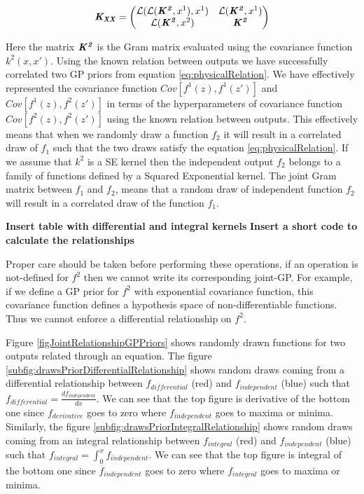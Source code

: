 \begin{equation}
    \bm{\mathit{K_{XX}}} = \begin{pmatrix}
    \mathcal{L}(\mathcal{L}(\bm{\mathit{K^2}}, x^{1}), x^{1}) & \mathcal{L}(\bm{\mathit{K^2}}, x^{1})\\ \mathcal{L}(\bm{\mathit{K^2}}, x^{2}) & \bm{\mathit{K^2}}
    \end{pmatrix} 
\end{equation}

Here the matrix $\bm{\mathit{K^2}}$ is the Gram matrix evaluated using the covariance function $k^2(x, x')$. Using the known relation between outputs we have successfully correlated two GP priors from equation \ref{eq:physicalRelation}. We have effectively represented the covariance function \(Cov[f^1(z), f^1(z')]\) and \(Cov[f^1(z), f^2(z')]\) in terms of the hyperparameters of covariance function $Cov[f^2(z), f^2(z')]$ using the known relation between outputs. This effectively means that when we randomly draw a function \(f_{2}\) it will result in a correlated draw of \(f_{1}\) such that the two draws satisfy the equation \ref{eq:physicalRelation}. If we assume that $k^2$ is a SE kernel then the independent output \(f_{2}\) belongs to a family of functions defined by a Squared Exponential kernel. The joint Gram matrix between \(f_{1}\) and \(f_{2}\), means that a random draw of independent function \(f_{2}\) will result in a correlated draw of the function \(f_{1}\). 

\textbf{Insert table with differential and integral kernels}
\textbf{Insert a short code to calculate the relationships}

Proper care should be taken before performing these operations, if an operation is not-defined for $f^2$ then we cannot write its corresponding joint-GP. For example, if we define a GP prior for $f^2$ with exponential covariance function, this covariance function defines a hypothesis space of non-differentiable functions. Thus we cannot enforce a differential relationship on $f^2$. 

Figure \ref{figJointRelationshipGPPriors} shows randomly drawn functions for two outputs related through an equation. The figure  \ref{subfig:drawsPriorDifferentialRelationship} shows random draws coming from a differential relationship between \(f_{differential}\) (red) and \(f_{independent}\) (blue) such that \(f_{differential} = \frac{d f_{independent}}{d x}\). We can see that the top figure is derivative of the bottom one since \(f_{derivative}\) goes to zero where \(f_{independent}\) goes to maxima or minima. Similarly, the figure \ref{subfig:drawsPriorIntegralRelationship} shows random draws coming from an integral relationship between \(f_{integral}\) (red) and \(f_{independent}\) (blue) such that \(f_{integral} = \int_{0}^x f_{independent}\). We can see that the top figure is integral of the bottom one since \(f_{independent}\) goes to zero where \(f_{integral}\) goes to maxima or minima. 

